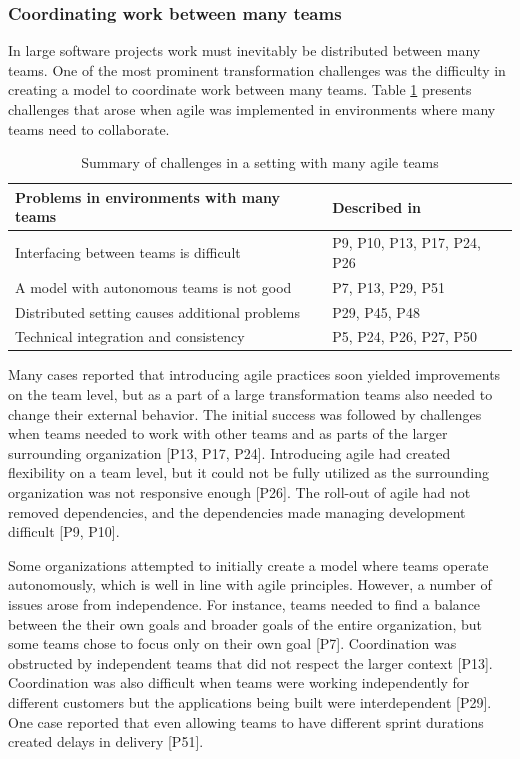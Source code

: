 \subsubsection{Coordinating work between many teams}

In large software projects work must inevitably be distributed between many
teams. One of the most prominent transformation challenges was the difficulty in
creating a model to coordinate work between many teams. Table
\ref{table:challenges_coordinatingteams} presents challenges that arose when
agile was implemented in environments where many teams need to collaborate.

\begin{table}[h]
    \centering
    \begin{tabular}{ >{\raggedright\arraybackslash}p{}
                     >{\raggedright\arraybackslash}p{} }
        \toprule
        Problems in environments with many teams  &  Described in \\
        \midrule
        Interfacing between teams is difficult     &  P9, P10, P13, P17, P24, P26 \\
        A model with autonomous teams is not good  &  P7, P13, P29, P51  \\
        Distributed setting causes additional problems  &  P29, P45, P48  \\
        Technical integration and consistency      &  P5, P24, P26, P27, P50  \\
        \bottomrule
    \end{tabular}
    \caption{Summary of challenges in a setting with many agile teams}
    \label{table:challenges_coordinatingteams}
\end{table}

Many cases reported that introducing agile practices soon yielded improvements
on the team level, but as a part of a large transformation teams also needed to
change their external behavior.
The initial success was followed by challenges when teams needed to work with
other teams and as parts of the larger surrounding organization [P13, P17, P24].
Introducing agile had created flexibility on a team level, but it could not be
fully utilized as the surrounding organization was not responsive enough [P26].
The roll-out of agile had not removed dependencies, and the dependencies
made managing development difficult [P9, P10].


Some organizations attempted to initially create a model where teams operate
autonomously, which is well in line with agile principles. However, a number of
issues arose from independence. For instance, teams needed to find a balance
between the their own goals and broader goals of the entire organization, but
some teams chose to focus only on their own goal [P7]. Coordination was
obstructed by independent teams that did not respect the larger context [P13].
Coordination was also difficult when teams were working independently for
different customers but the applications being built were interdependent [P29].
One case reported that even allowing teams to have different sprint durations
created delays in delivery [P51].

